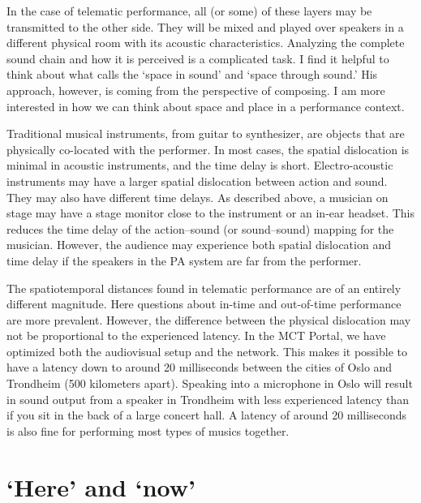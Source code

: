 In the case of telematic performance, all (or some) of these layers may be transmitted to the other side. They will be mixed and played over speakers in a different physical room with its acoustic characteristics. Analyzing the complete sound chain and how it is perceived is a complicated task. I find it helpful to think about what \citet{moore_sonic_2016} calls the `space in sound' and `space through sound.' His approach, however, is coming from the perspective of composing. I am more interested in how we can think about space and place in a performance context. %

Traditional musical instruments, from guitar to synthesizer, are objects that are physically co-located with the performer. In most cases, the spatial dislocation is minimal in acoustic instruments, and the time delay is short. Electro-acoustic instruments may have a larger spatial dislocation between action and sound. They may also have different time delays. As described above, a musician on stage may have a stage monitor close to the instrument or an in-ear headset. This reduces the time delay of the action--sound (or sound--sound) mapping for the musician. However, the audience may experience both spatial dislocation and time delay if the speakers in the PA system are far from the performer.

The spatiotemporal distances found in telematic performance are of an entirely different magnitude. Here questions about in-time and out-of-time performance are more prevalent. However, the difference between the physical dislocation may not be proportional to the experienced latency. In the MCT Portal, we have optimized both the audiovisual setup and the network. This makes it possible to have a latency down to around 20 milliseconds between the cities of Oslo and Trondheim (500 kilometers apart). Speaking into a microphone in Oslo will result in sound output from a speaker in Trondheim with less experienced latency than if you sit in the back of a large concert hall. A latency of around 20 milliseconds is also fine for performing most types of musics together.

\section{`Here' and `now'}

